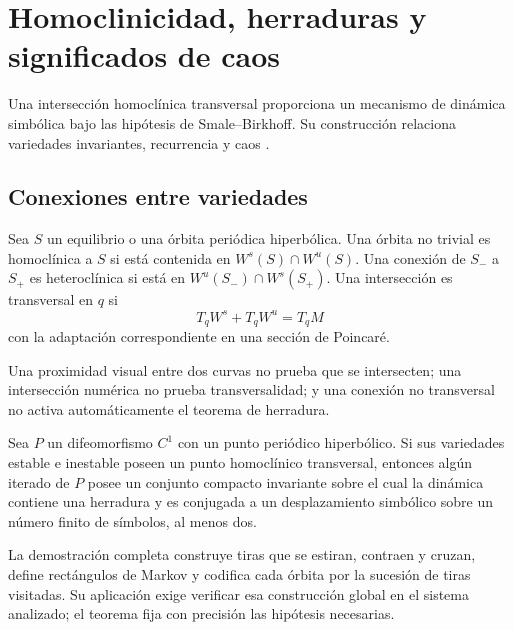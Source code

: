 \section{Homoclinicidad, herraduras y significados de caos}
\label{sec:geo-homoclinic-chaos}

\HAFOCardChaos

Una intersección homoclínica transversal proporciona un mecanismo de dinámica
simbólica bajo las hipótesis de Smale--Birkhoff. Su construcción relaciona
variedades invariantes, recurrencia y caos
\cite{HirschSmaleDevaney2013,DatserisParlitz2022Nonlinear}.

\subsection{Conexiones entre variedades}

\begin{definition}
Sea \(S\) un equilibrio o una órbita periódica hiperbólica. Una órbita no
trivial es homoclínica a \(S\) si está contenida en
\(W^s(S)\cap W^u(S)\). Una conexión de \(S_-\) a \(S_+\) es heteroclínica si
está en \(W^u(S_-)\cap W^s(S_+)\). Una intersección es transversal en \(q\)
si
\begin{equation}
 T_qW^s+T_qW^u=T_qM
 \label{geo:eq:transverse-intersection}
\end{equation}
con la adaptación correspondiente en una sección de Poincaré.
\end{definition}

Una proximidad visual entre dos curvas no prueba que se intersecten; una
intersección numérica no prueba transversalidad; y una conexión no transversal
no activa automáticamente el teorema de herradura.

\begin{proposition}
Sea \(P\) un difeomorfismo \(C^1\) con un punto periódico hiperbólico. Si sus
variedades estable e inestable poseen un punto homoclínico transversal,
entonces algún iterado de \(P\) posee un conjunto compacto invariante sobre el
cual la dinámica contiene una herradura y es conjugada a un desplazamiento
simbólico sobre un número finito de símbolos, al menos dos.
\end{proposition}

La demostración completa construye tiras que se estiran, contraen y cruzan,
define rectángulos de Markov y codifica cada órbita por la sucesión de tiras
visitadas. Su aplicación exige verificar esa construcción global en el sistema
analizado; el teorema fija con precisión las hipótesis necesarias.


